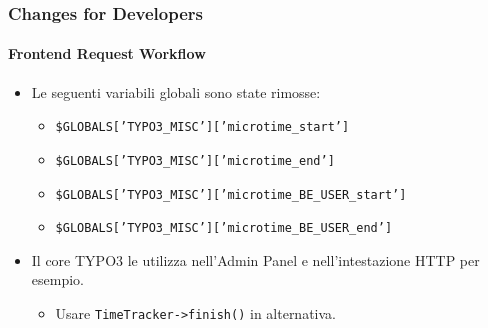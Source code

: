 \begin{frame}[fragile]
	\frametitle{Changes for Developers}
	\framesubtitle{Frontend Request Workflow}

	\lstset{basicstyle=\smaller\ttfamily}

	\begin{itemize}
		\item Le seguenti variabili globali sono state rimosse:

			\begin{itemize}
				\item \texttt{\$GLOBALS['TYPO3\_MISC']['microtime\_start']}
				\item \texttt{\$GLOBALS['TYPO3\_MISC']['microtime\_end']}
				\item \texttt{\$GLOBALS['TYPO3\_MISC']['microtime\_BE\_USER\_start']}
				\item \texttt{\$GLOBALS['TYPO3\_MISC']['microtime\_BE\_USER\_end']}
			\end{itemize}

		\item Il core TYPO3 le utilizza nell'Admin Panel e nell'intestazione HTTP per esempio.

			\begin{itemize}\smaller
				\item[\ding{228}] Usare \texttt{TimeTracker->finish()} in alternativa.
			\end{itemize}\normalsize

	\end{itemize}

\end{frame}



